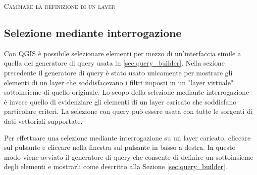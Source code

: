 \begin{Tip}\caption{\textsc{Cambiare la definizione di un layer}}
\end{Tip}

\subsection{Selezione mediante interrogazione}\label{sec:select_by_query}

Con QGIS è possibile selezionare elementi per mezzo di un'interfaccia simile a
quella del generatore di query usata in \ref{sec:query_builder}.
Nella sezione precedente il generatore di query è stato usato unicamente per
mostrare gli elementi di un layer che soddisfacevano i filtri imposti in un
"layer virtuale" sottoinsieme di quello originale. Lo scopo della selezione
mediante interrogazione è invece quello di evidenziare gli elementi di un
layer caricato che soddisfano particolare criteri.
La selezione con query può essere usata con tutte le sorgenti di dati
vettoriali supportate.

Per effettuare una selezione mediante interrogazione su un layer caricato,
cliccare sul pulsante 
e cliccare nella finestra sul pulsante  in basso a
destra. In questo modo viene avviato il generatore di query che
consente di definire un sottoinsieme degli elementi e mostrarli come descritto
alla Sezione \ref{sec:query_builder}.


